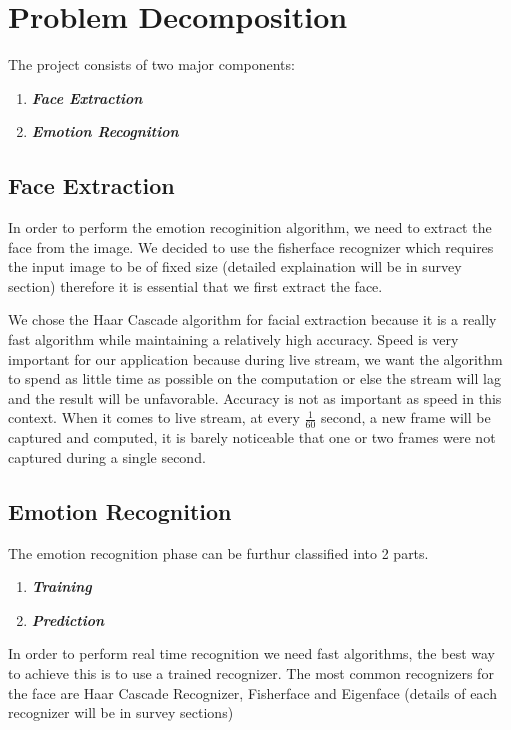\documentclass[11pt,journal]{IEEEtran}
\begin{document}
\section{Problem Decomposition}
  The project consists of two major components:
  \begin{enumerate}
    \item \textbf{\textit{Face Extraction}}
    \item \textbf{\textit{Emotion Recognition}}
  \end{enumerate}

  \subsection{Face Extraction}
    In order to perform the emotion recoginition algorithm, we need to extract the face from the image. We decided to use the fisherface recognizer which requires the input image to be of fixed size (detailed explaination will be in survey section) therefore it is essential that we first extract the face.

    We chose the Haar Cascade algorithm for facial extraction because it is a really fast algorithm while maintaining a relatively high accuracy. Speed is very important for our application because during live stream, we want the algorithm to spend as little time as possible on the computation or else the stream will lag and the result will be unfavorable. Accuracy is not as important as speed in this context. When it comes to live stream, at every $\frac{1}{60}$ second, a new frame will be captured and computed, it is barely noticeable that one or two frames were not captured during a single second.


  \subsection{Emotion Recognition}
    The emotion recognition phase can be furthur classified into 2 parts.

    \begin{enumerate}
      \item \textbf{\textit{Training}}
      \item \textbf{\textit{Prediction}}
    \end{enumerate}

    In order to perform real time recognition we need fast algorithms, the best way to achieve this is to use a trained recognizer. The most common recognizers for the face are Haar Cascade Recognizer, Fisherface and Eigenface (details of each recognizer will be in survey sections)
\end{document}
